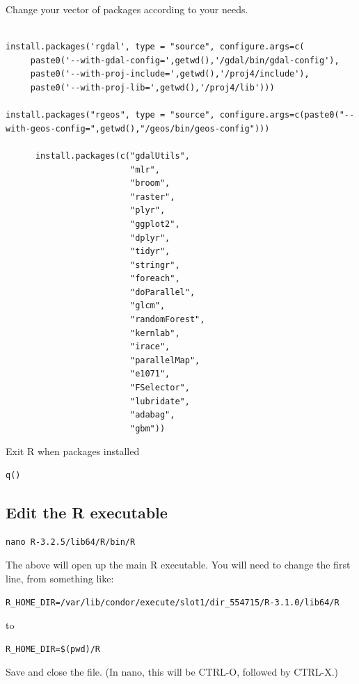 \documentclass{article}
\begin{document}
Change your vector of packages according to your needs.
\begin{verbatim}

install.packages('rgdal', type = "source", configure.args=c(
     paste0('--with-gdal-config=',getwd(),'/gdal/bin/gdal-config'),
     paste0('--with-proj-include=',getwd(),'/proj4/include'),
     paste0('--with-proj-lib=',getwd(),'/proj4/lib')))

install.packages("rgeos", type = "source", configure.args=c(paste0("--with-geos-config=",getwd(),"/geos/bin/geos-config")))

      install.packages(c("gdalUtils",
                         "mlr",
                         "broom",
                         "raster",
                         "plyr",
                         "ggplot2",
                         "dplyr",
                         "tidyr",
                         "stringr",
                         "foreach",
                         "doParallel",
                         "glcm",
                         "randomForest",
                         "kernlab",
                         "irace",
                         "parallelMap",
                         "e1071",
                         "FSelector",
                         "lubridate",
                         "adabag",
                         "gbm"))

\end{verbatim}

Exit R when packages installed
\begin{verbatim}
q()
\end{verbatim}

\subsection*{Edit the R executable}
\label{sec:org896a4ef}
\begin{verbatim}
nano R-3.2.5/lib64/R/bin/R
\end{verbatim}

The above will open up the main R executable. You will need to change
the first line, from something like:

\begin{verbatim}
R_HOME_DIR=/var/lib/condor/execute/slot1/dir_554715/R-3.1.0/lib64/R
\end{verbatim}
to
\begin{verbatim}
R_HOME_DIR=$(pwd)/R
\end{verbatim}

Save and close the file. (In nano, this will be CTRL-O, followed by CTRL-X.)
\end{document}
